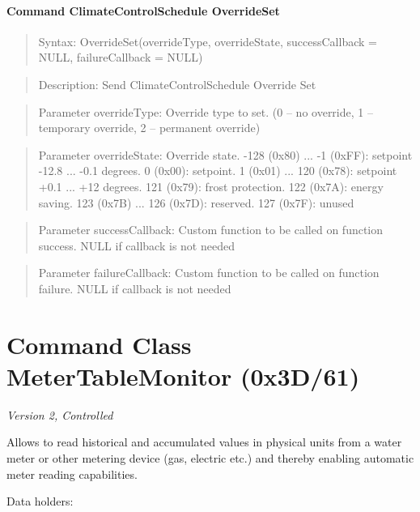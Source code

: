 \paragraph{Command ClimateControlSchedule OverrideSet}
\begin{quote}Syntax: OverrideSet(overrideType, overrideState, successCallback = NULL, failureCallback = NULL)\end{quote}
\begin{quote}Description: Send ClimateControlSchedule Override Set\end{quote}
\begin{quote}Parameter overrideType: Override type to set. (0 – no override, 1 – temporary override, 2 – permanent override)\end{quote}
\begin{quote}Parameter overrideState: Override state. -128 (0x80) ... -1 (0xFF): setpoint -12.8 ... -0.1 degrees. 0 (0x00): setpoint. 1 (0x01) ... 120 (0x78): setpoint +0.1 ... +12 degrees. 121 (0x79): frost protection. 122 (0x7A): energy saving. 123 (0x7B) ... 126 (0x7D): reserved. 127 (0x7F): unused\end{quote}
\begin{quote}Parameter successCallback: Custom function to be called on function success. NULL if callback is not needed\end{quote}
\begin{quote}Parameter failureCallback: Custom function to be called on function failure. NULL if callback is not needed\end{quote}



\section{Command Class MeterTableMonitor (0x3D/61)}

\textit{Version 2, Controlled}
\newline

Allows to read historical and accumulated values in physical units from a water meter or other metering device (gas, electric etc.) and thereby enabling automatic meter reading capabilities.
\newline

\noindent
Data holders:

